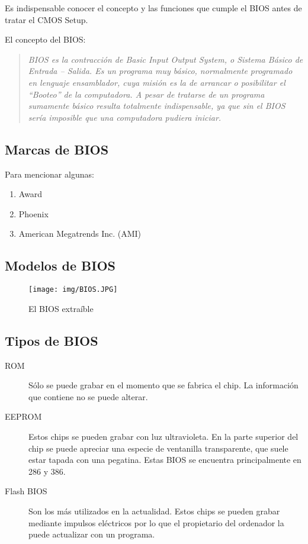 \documentclass[12pt,oneside,a4paper]{article}
\begin{document}
	Es indispensable conocer el concepto y las funciones que cumple el BIOS antes de tratar el CMOS Setup.

	El concepto del BIOS:
	\begin{quotation}

		{\em BIOS es la contracción de Basic Input Output System, o Sistema Básico de
		Entrada – Salida. 
		Es un programa muy básico, normalmente programado en lenguaje ensamblador,
		cuya misión es la de arrancar o posibilitar el “Booteo” de la computadora.
		A pesar de tratarse de un programa sumamente básico resulta totalmente
		indispensable, ya que sin el BIOS sería imposible que una computadora pudiera
		iniciar.}

	\end{quotation}
			
	\subsection{Marcas de BIOS}\label{sub:marcas de bios}
		Para mencionar algunas:
		\begin{enumerate}
			\item Award
			\item Phoenix
			\item American Megatrends Inc. (AMI)
		\end{enumerate}
	
	\subsection{Modelos de BIOS}\label{sub:modelos de bios}
		\begin{figure}[H]
			\centering
				\texttt{[image: img/BIOS.JPG]}
			\caption{El BIOS extraíble}
		\end{figure}
	
	\subsection{Tipos de BIOS}\label{sub:chips bios}
		
		\begin{description}
			\item[ROM] Sólo se puede grabar en el momento que se fabrica el
				chip. La información que contiene no se puede alterar.
			\item[EEPROM] Estos chips se pueden grabar con luz ultravioleta. En
				la parte superior del chip se puede apreciar una especie de
				ventanilla transparente, que suele estar tapada con una
				pegatina. Estas BIOS se encuentra principalmente en 286 y 386.
				\cite{EEPROM}
			\item[Flash BIOS] Son los más utilizados en la actualidad. Estos
				chips se pueden grabar mediante impulsos eléctricos por lo que
				el propietario del ordenador la puede actualizar con un
				programa.
		\end{description}
\end{document}
